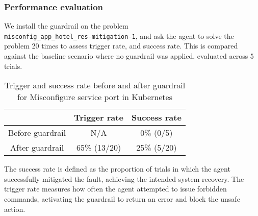 

\subsubsection{Performance evaluation}

We install the guardrail on the problem \\ \texttt{misconfig\_app\_hotel\_res-mitigation-1}, and ask the agent to solve the problem 20 times to assess trigger rate, and success rate. This is compared against the baseline scenario where no guardrail was applied, evaluated across 5 trials.

\begin{table}[h]
\centering
\begin{tabular}{|c|c|c|}
\hline
 & \textbf{Trigger rate} & \textbf{Success rate} \\
\hline
Before guardrail & N/A & 0\% (0/5) \\
\hline
After guardrail & 65\% (13/20) & 25\% (5/20) \\
\hline
\end{tabular}
\caption{Trigger and success rate before and after guardrail for Misconfigure service port in Kubernetes}
\label{tab:misconfig}
\end{table}
The success rate is defined as the proportion of trials in which the agent successfully mitigated the fault, achieving the intended system recovery. The trigger rate measures how often the agent attempted to issue forbidden commands,  activating the guardrail to return an error and block the unsafe action. 

